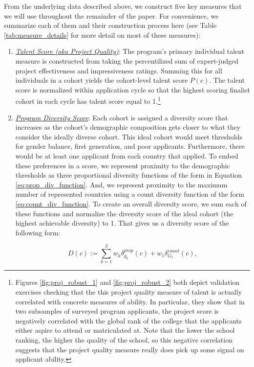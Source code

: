 From the underlying data described above, we construct five key measures that we will use throughout the remainder of the paper. For convenience, we summarize each of them and their construction process here (see Table \ref{tab:measure_details} for more detail on most of these measures):

\begin{enumerate}
\item \underline{\emph{Talent Score (aka Project Quality)}}: The program’s primary individual talent measure is constructed from taking the percentilized sum of expert-judged project effectiveness and impressiveness ratings. Summing this for all individuals in a cohort yields the cohort-level talent score $P(c)$. The talent score is normalized within application cycle so that the highest scoring finalist cohort in each cycle has talent score equal to 1.\footnote{Figures \ref{fig:proj_robust_1} and \ref{fig:proj_robust_2} both depict validation exercises checking that the this project quality measure of talent is actually correlated with concrete measures of ability. In particular, they show that in two subsamples of surveyed program applicants, the project score is negatively correlated with the global rank of the college that the applicants either aspire to attend or matriculated at. Note that the lower the school ranking, the higher the quality of the school, so this negative correlation suggests that the project quality measure really does pick up some signal on applicant ability.}

\item \underline{\emph{Program Diversity Score}}: Each cohort is assigned a diversity score that increases as the cohort's demographic composition gets closer to what they consider the ideally diverse cohort. This ideal cohort would meet thresholds for gender balance, first generation, and poor applicants. Furthermore, there would be at least one applicant from each country that applied. To embed these preferences in a score, we represent proximity to the demographic thresholds as three proportional diversity functions of the form in Equation \ref{eq:prop_div_function}. And, we represent proximity to the maximum number of represented countries using a count diversity function of the form \ref{eq:count_div_function}. To create an overall diversity score, we sum each of these functions and normalize the diversity score of the ideal cohort (the highest achievable diversity) to 1. That gives us a diversity score of the following form: 

\begin{equation}
D(c) := \sum_{k = 1}^3w_k\delta_{g_k}^{prop}(c) + w_1\delta_{G_1}^{count}(c),
\end{equation}


\end{enumerate}
